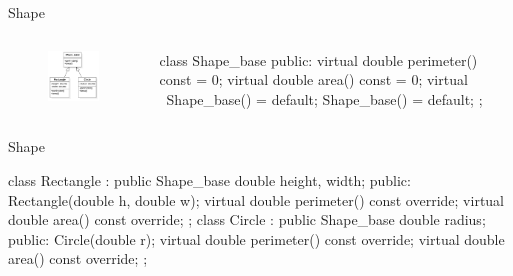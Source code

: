 \documentclass{beamer}
\begin{document}
\begin{frame}[fragile]{Shape}
    \begin{columns}
        \begin{column}{0.4\linewidth}
            \begin{figure}[h]
                \centering
                \includegraphics[scale=0.5]{figures/shape_uml.png}
            \end{figure}        
        \end{column}
        \begin{column}{0.7\linewidth}
            \begin{cpp}
class Shape_base {
 public:
  virtual double perimeter() const = 0;
  virtual double area() const = 0;
  virtual ~Shape_base() = default;
  Shape_base() = default;
};
            \end{cpp}
        \end{column}
    \end{columns}
\end{frame}

\begin{frame}[fragile]{Shape}
    \begin{cpp}
class Rectangle : public Shape_base {
  double height, width;
 public:
  Rectangle(double h, double w);
  virtual double perimeter() const override;
  virtual double area() const override;
};
class Circle : public Shape_base {
  double radius;
 public:
  Circle(double r);
  virtual double perimeter() const override;
  virtual double area() const override;
};
    \end{cpp}
\end{frame}
\end{document}
